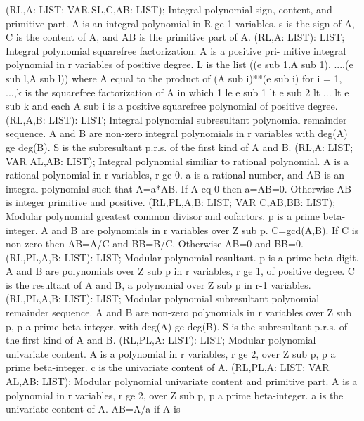  (RL,A: LIST; VAR SL,C,AB: LIST); \eproc
\bcom Integral polynomial sign, content, and primitive part. A is
an integral polynomial in R ge 1 variables.  s is
the sign of A, C is the content of A, and AB is the primitive
part of A. \ecom 
{} (RL,A: LIST): LIST; \eproc
\bcom Integral polynomial squarefree factorization. A is a positive pri-
mitive integral polynomial in r variables of positive degree.  L is
the list ((e sub 1,A sub 1), ...,(e sub l,A sub l)) where A equal to
the product of (A sub i)**(e sub i) for i = 1, ...,k is the
squarefree factorization of A in which 1 le e sub 1 lt e sub 2 lt  ...
lt e sub k and each A sub i is a positive squarefree polynomial of
positive degree. \ecom 
{} (RL,A,B: LIST): LIST; \eproc
\bcom Integral polynomial subresultant polynomial remainder sequence.
A and B are non-zero integral polynomials in r variables with
deg(A) ge deg(B).  S is the subresultant p.r.s. of the first kind
of A and B. \ecom 
{} (RL,A: LIST; VAR AL,AB: LIST); \eproc
\bcom Integral polynomial similiar to rational polynomial. A is a
rational polynomial in r variables, r ge 0.  a is a
rational number, and AB is an integral polynomial such that A=a*AB. If
A eq 0 then a=AB=0. Otherwise AB is integer primitive and positive. \ecom 
{} (RL,PL,A,B: LIST; VAR C,AB,BB: LIST); \eproc
\bcom Modular polynomial greatest common divisor and cofactors. p is a
prime beta-integer.  A and B are polynomials in r variables over
Z sub p.  C=gcd(A,B).  If C is non-zero then AB=A/C and BB=B/C.
Otherwise AB=0 and BB=0. \ecom 
{} (RL,PL,A,B: LIST): LIST; \eproc
\bcom Modular polynomial resultant. p is a prime beta-digit. A and B are
polynomials over Z sub p in r variables, r ge 1, of positive degree.
C is the resultant of A and B, a polynomial over Z sub p in r-1
variables. \ecom 
{} (RL,PL,A,B: LIST): LIST; \eproc
\bcom Modular polynomial subresultant polynomial remainder sequence.
A and B are non-zero polynomials in r variables over Z sub p,
p a prime beta-integer, with deg(A) ge deg(B).
S is the subresultant p.r.s. of the first kind of A and B. \ecom 
{} (RL,PL,A: LIST): LIST; \eproc
\bcom Modular polynomial univariate content. A is a polynomial in r
variables, r ge 2, over Z sub p, p a prime beta-integer.  c is the
univariate content of A. \ecom 
{} (RL,PL,A: LIST; VAR AL,AB: LIST); \eproc
\bcom Modular polynomial univariate content and primitive part. A is a
polynomial in r variables, r ge 2, over Z sub p, p a prime
beta-integer.  a is the univariate content of A.  AB=A/a if A is
